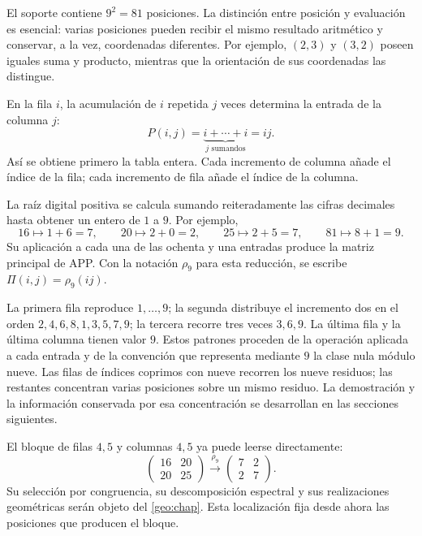 El soporte contiene $9^2=81$ posiciones. La distinción entre posición y evaluación es esencial: varias posiciones pueden recibir el mismo resultado aritmético y conservar, a la vez, coordenadas diferentes. Por ejemplo, $(2,3)$ y $(3,2)$ poseen iguales suma y producto, mientras que la orientación de sus coordenadas las distingue.

En la fila $i$, la acumulación de $i$ repetida $j$ veces determina la entrada de la columna $j$:
\[
 P(i,j)=\underbrace{i+\cdots+i}_{j\text{ sumandos}}=ij.
\]
Así se obtiene primero la tabla entera. Cada incremento de columna añade el índice de la fila; cada incremento de fila añade el índice de la columna.



La raíz digital positiva se calcula sumando reiteradamente las cifras decimales hasta obtener un entero de $1$ a $9$. Por ejemplo,
\[
 16\longmapsto1+6=7,\qquad
 20\longmapsto2+0=2,\qquad
 25\longmapsto2+5=7,\qquad
 81\longmapsto8+1=9.
\]
Su aplicación a cada una de las ochenta y una entradas produce la matriz principal de APP. Con la notación $\rho_9$ para esta reducción, se escribe $\Pi(i,j)=\rho_9(ij)$.



La primera fila reproduce $1,\ldots,9$; la segunda distribuye el incremento dos en el orden $2,4,6,8,1,3,5,7,9$; la tercera recorre tres veces $3,6,9$. La última fila y la última columna tienen valor $9$. Estos patrones proceden de la operación aplicada a cada entrada y de la convención que representa mediante $9$ la clase nula módulo nueve. Las filas de índices coprimos con nueve recorren los nueve residuos; las restantes concentran varias posiciones sobre un mismo residuo. La demostración y la información conservada por esa concentración se desarrollan en las secciones siguientes.

El bloque de filas $4,5$ y columnas $4,5$ ya puede leerse directamente:
\[
 \begin{pmatrix}16&20\\20&25\end{pmatrix}
 \xrightarrow{\ \rho_9\ }
 \begin{pmatrix}7&2\\2&7\end{pmatrix}.
\]
Su selección por congruencia, su descomposición espectral y sus realizaciones geométricas serán objeto del \cref{geo:chap}. Esta localización fija desde ahora las posiciones que producen el bloque.

